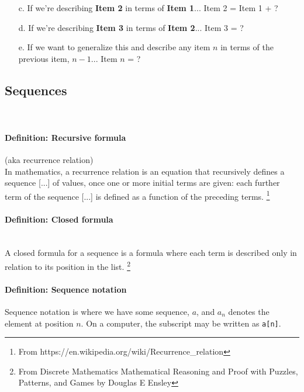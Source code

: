 {\begin{questionNOGRADE}{\thequestion}
\begin{enumerate}
            ...How can we come up with some formula to associate the item \# to the value?

            \item[c.] If we're describing \textbf{Item 2} in terms of \textbf{Item 1}...
                Item 2 = Item 1 + ?

            \item[d.] If we're describing \textbf{Item 3} in terms of \textbf{Item 2}...
                Item 3 = ?

            \item[e.] If we want to generalize this and describe any item $n$ in terms of
                the previous item, $n-1$...
                Item $n$ = ?
        \end{enumerate}
    \end{questionNOGRADE}

    \newpage

    \subsection{Sequences}
    
    \begin{intro}{\ }
        \paragraph{Definition: Recursive formula} (aka recurrence relation) \\
        In mathematics, a recurrence relation is an equation that recursively defines
        a sequence [...] of values, once one or more initial terms are given:
        each further term of the sequence [...] is defined as a function
        of the preceding terms.
        \footnote{From https://en.wikipedia.org/wiki/Recurrence\_relation}

        \paragraph{Definition: Closed formula} ~\\
        A closed formula for a sequence is a formula where each term is described
        only in relation to its position in the list.
        \footnote{From Discrete Mathematics Mathematical Reasoning and Proof with Puzzles, Patterns, and Games by Douglas E Ensley}

        \paragraph{Definition: Sequence notation}
        Sequence notation is where we have some sequence, $a$,
        and $a_{n}$ denotes the element at position $n$. On a computer,
        the subscript may be written as \texttt{a[n]}.
    \end{intro}


}
